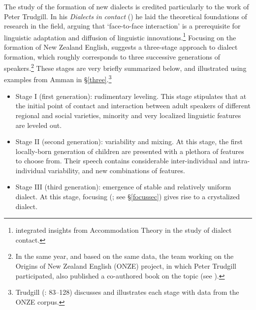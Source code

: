 \documentclass[output=paper]{langsci/langscibook}
\begin{document}
The study of the formation of new dialects is credited particularly to the work of Peter Trudgill. In his \textit{Dialects} \textit{in} \textit{contact} (\citeyear{Trudgill1986}) he laid the theoretical foundations of research in the field, arguing that ‘face-to-face interaction’ is a prerequisite for linguistic adaptation and diffusion of linguistic innovations.\footnote{\citet{Trudgill1986} integrated insights from Accommodation Theory \citep{Giles1973} in the study of dialect contact.} Focusing on the formation of New Zealand English, \citet{Trudgill2004} suggests a three-stage approach to dialect formation, which roughly corresponds to three successive generations of speakers.\footnote{In the same year, and based on the same data, the team working on the Origins of New Zealand English (ONZE) project, in which Peter Trudgill participated, also published a co-authored book on the topic (see \citealt{GordonEtAl2004}).} These stages are very briefly summarized below, and illustrated using examples from Amman in §\ref{three}.\footnote{Trudgill (\citeyear{Trudgill2004}: 83–128) discusses and illustrates each stage with data from the ONZE corpus.}

\begin{itemize}
    \item[] 
Stage I (first generation): rudimentary leveling. This stage stipulates that at the initial point of contact and interaction between adult speakers of different regional and social varieties, minority and very localized linguistic features are leveled out.

\item[]
Stage II (second generation): variability and mixing. At this stage, the first locally-born generation of children are presented with a plethora of features to choose from. Their speech contains considerable inter-individual and intra-individual variability, and new combinations of features.

\item[] 
Stage III (third generation): emergence of stable and relatively uniform dialect. At this stage, focusing (\citealt{LePageTabouret-Keller1985}; see §\ref{focussec}) gives rise to a crystalized dialect. 
\end{itemize}
\end{document}
